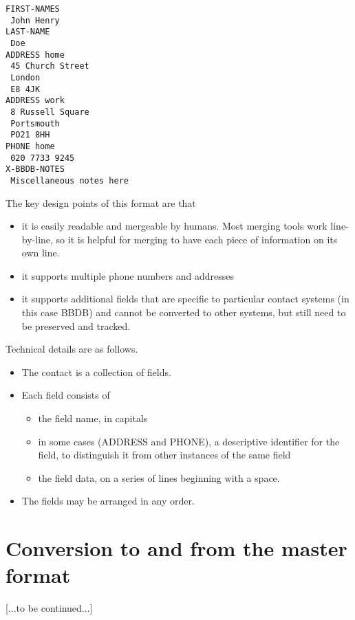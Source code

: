 \documentclass{article}
\begin{document}
\begin{verbatim}
FIRST-NAMES
 John Henry
LAST-NAME
 Doe
ADDRESS home
 45 Church Street
 London
 E8 4JK
ADDRESS work
 8 Russell Square
 Portsmouth
 PO21 8HH
PHONE home
 020 7733 9245
X-BBDB-NOTES
 Miscellaneous notes here
\end{verbatim}

The key design points of this format are that

\begin{itemize}

\item it is easily readable and mergeable by humans.  Most merging
  tools work line-by-line, so it is helpful for merging to have each
  piece of information on its own line.

\item it supports multiple phone numbers and addresses

\item it supports additional fields that are specific to particular
  contact systems (in this case BBDB) and cannot be converted to other
  systems, but still need to be preserved and tracked.

\end{itemize}

Technical details are as follows.

\begin{itemize}

\item The contact is a collection of fields.

\item Each field consists of
  \begin{itemize}
    \item the field name, in capitals
    \item in some cases (ADDRESS and PHONE), a descriptive identifier
      for the field, to distinguish it from other instances of the
      same field
    \item the field data, on a series of lines beginning with a space.
  \end{itemize}

\item The fields may be arranged in any order.

\end{itemize}

\section{Conversion to and from the master format}

[...to be continued...]
\end{document}
